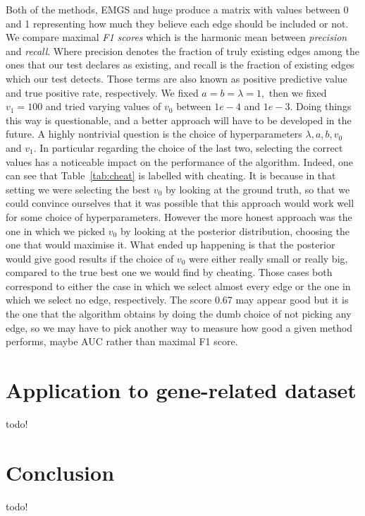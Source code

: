 \documentclass{scrartcl}
\begin{document}
Both of the methods, EMGS and huge produce a matrix with values between 0 and 1 representing how much they believe each edge should be included or not.
We compare maximal \emph{F1 scores} which is the harmonic mean between \emph{precision}
and \emph{recall}. Where precision denotes the fraction of truly existing edges
among the ones that our test declares as existing, and recall is the fraction
of existing edges which our test detects. Those terms are also known as
positive predictive value and true positive rate, respectively.
We fixed $a = b = \lambda = 1,$ then we fixed $v_1 = 100$ and tried varying
values of $v_0$ between $1e-4$ and $1e-3$.
Doing things this way is questionable, and a better approach will have to be
developed in the future.
A highly nontrivial question is the choice of hyperparameters $\lambda, a, b,
	v_0$ and $v_1$. In particular regarding the choice of the last two, selecting
the correct values has a noticeable impact on the performance of the algorithm.
Indeed, one can see that Table~\cref{tab:cheat} is labelled with cheating. It is because in that setting we were selecting the
best $v_0$ by looking at the ground truth, so that we could convince ourselves
that it was possible that this approach would work well for some choice of
hyperparameters.
However the more honest approach was the one in which we picked $v_0$ by
looking at the posterior distribution, choosing the one that would maximise it.
What ended up happening is that the posterior would give good results if the
choice of $v_0$ were either really small or really big, compared to the true
best one we would find by cheating.
Those cases both correspond to either the case in which we select almost every
edge or the one in which we select no edge, respectively.
The score 0.67 may appear good but it is the one that the algorithm obtains by
doing the dumb choice of not picking any edge, so we may have to pick another
way to measure how good a given method performs, maybe AUC rather than maximal F1 score.

\section{Application to gene-related dataset}
todo!

\section{Conclusion}
todo!

\printbibliography
\end{document}
